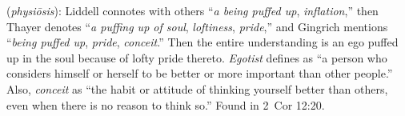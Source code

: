 \item[Egotist,]

(\textit{physiōsis}):
Liddell connotes with others ``\emph{a being puffed up}, \emph{inflation},'' then Thayer denotes ``\emph{a puffing up of soul}, \emph{loftiness}, \emph{pride},'' and Gingrich mentions ``\emph{being puffed up}, \emph{pride}, \emph{conceit}.'' Then the entire understanding is an ego puffed up in the soul because of lofty pride thereto. \emph{Egotist} defines as ``a person who considers himself or herself to be better or more important than other people.'' Also, \emph{conceit} as ``the habit or attitude of thinking yourself better than others, even when there is no reason to think so.''
Found in 2~Cor 12:20.
